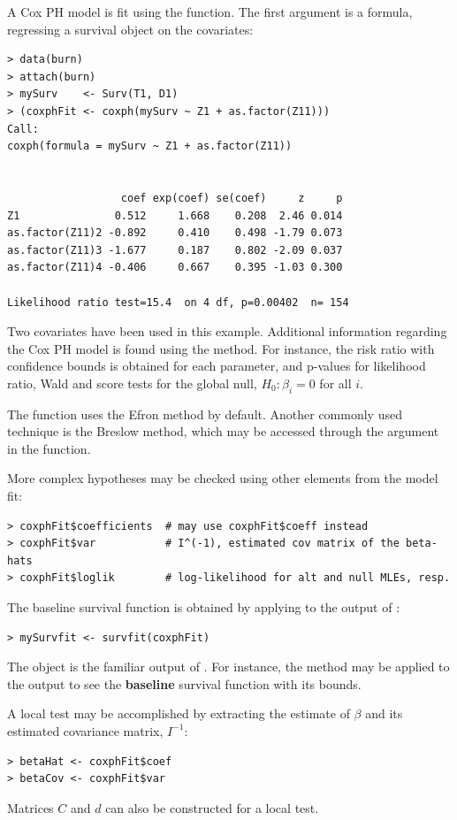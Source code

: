 \documentclass[article]{jss}
\begin{document}
A Cox PH model is fit using the  function. The first argument is a formula, regressing a survival object on the covariates:
\begin{verbatim}
> data(burn)
> attach(burn)
> mySurv    <- Surv(T1, D1)
> (coxphFit <- coxph(mySurv ~ Z1 + as.factor(Z11)))
Call:
coxph(formula = mySurv ~ Z1 + as.factor(Z11))


                  coef exp(coef) se(coef)     z     p
Z1               0.512     1.668    0.208  2.46 0.014
as.factor(Z11)2 -0.892     0.410    0.498 -1.79 0.073
as.factor(Z11)3 -1.677     0.187    0.802 -2.09 0.037
as.factor(Z11)4 -0.406     0.667    0.395 -1.03 0.300

Likelihood ratio test=15.4  on 4 df, p=0.00402  n= 154 
\end{verbatim}
Two covariates have been used in this example. Additional information regarding the Cox PH model is found using the  method. For instance, the risk ratio with confidence bounds is obtained for each parameter, and p-values for likelihood ratio, Wald and score tests for the global null, $H_0: \beta_i = 0$ for all $i$.

The  function uses the Efron method by default. Another commonly used technique is the Breslow method, which may be accessed through the  argument in the  function.

More complex hypotheses may be checked using other elements from the model fit:
\begin{verbatim}
> coxphFit$coefficients  # may use coxphFit$coeff instead
> coxphFit$var           # I^(-1), estimated cov matrix of the beta-hats
> coxphFit$loglik        # log-likelihood for alt and null MLEs, resp.
\end{verbatim}
The baseline survival function is obtained by applying  to the output of :
\begin{verbatim}
> mySurvfit <- survfit(coxphFit)
\end{verbatim}
The object  is the familiar output of . For instance, the  method may be applied to the output to see the \textbf{baseline} survival function with its bounds.

A local test may be accomplished by extracting the estimate of $\beta$ and its estimated covariance matrix, $I^{-1}$:
\begin{verbatim}
> betaHat <- coxphFit$coef
> betaCov <- coxphFit$var
\end{verbatim}
Matrices $C$ and $d$ can also be constructed for a local test.
\end{document}
